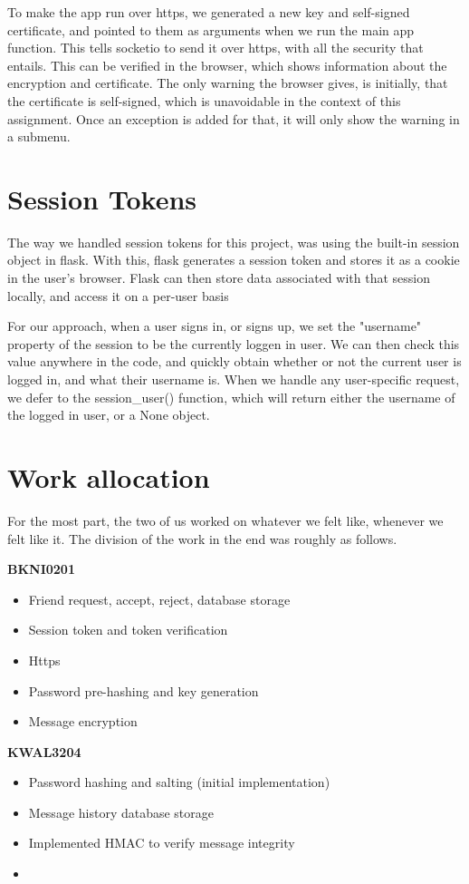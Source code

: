 \documentclass[12pt]{article}
\begin{document}
To make the app run over https, we generated a new key and self-signed certificate, and pointed to them as arguments when we run the main app function. This tells socketio to send it over https, with all the security that entails. This can be verified in the browser, which shows information about the encryption and certificate. The only warning the browser gives, is initially, that the certificate is self-signed, which is unavoidable in the context of this assignment. Once an exception is added for that, it will only show the warning in a submenu.

\section{Session Tokens}

The way we handled session tokens for this project, was using the built-in session object in flask. With this, flask generates a session token and stores it as a cookie in the user's browser. Flask can then store data associated with that session locally, and access it on a per-user basis

For our approach, when a user signs in, or signs up, we set the "username" property of the session to be the currently loggen in user. We can then check this value anywhere in the code, and quickly obtain whether or not the current user is logged in, and what their username is. When we handle any user-specific request, we defer to the session\_user() function, which will return either the username of the logged in user, or a None object.

\section{Work allocation}

For the most part, the two of us worked on whatever we felt like, whenever we felt like it. The division of the work in the end was roughly as follows.
\newline

\noindent \textbf{BKNI0201}

\begin{itemize}
\item Friend request, accept, reject, database storage
\item Session token and token verification
\item Https
\item Password pre-hashing and key generation
\item Message encryption
\end{itemize}

\noindent \textbf{KWAL3204}

\begin{itemize}
\item Password hashing and salting (initial implementation)
\item Message history database storage
\item Implemented HMAC to verify message integrity
\item 
\end{itemize}
\end{document}
